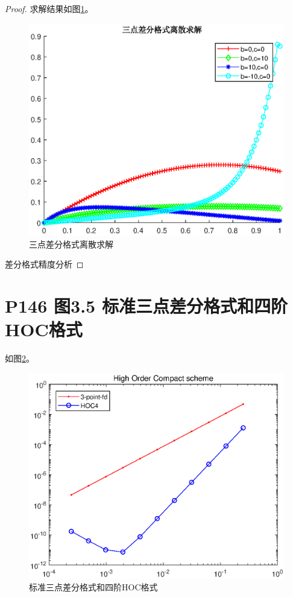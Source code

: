 \documentclass{article}%
\begin{document}
\begin{proof}

求解结果如图\ref{Fig:1.1}。

\begin{figure}[H]
	\includegraphics[width=1\linewidth]{week9_1_1.eps}
	\caption{三点差分格式离散求解}
	\label{Fig:1.1}
\end{figure}

差分格式精度分析

\end{proof}

\section{P146 图3.5 标准三点差分格式和四阶HOC格式}

如图\ref{Fig:2.1}。

\begin{figure}[H]
	\includegraphics[width=1\linewidth]{week9_2_1.eps}
	\caption{标准三点差分格式和四阶HOC格式}
	\label{Fig:2.1}
\end{figure}
\end{document}
